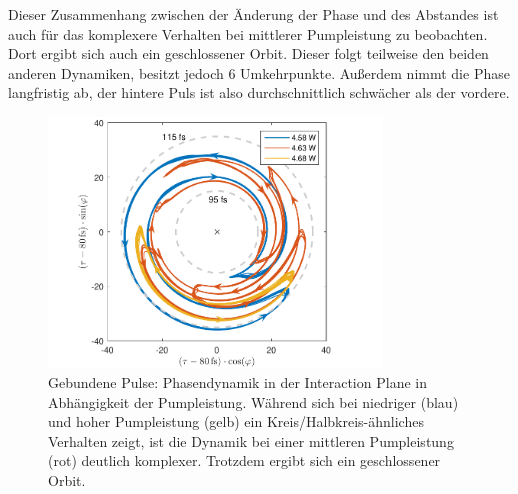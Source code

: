 \documentclass[bachelor,       %
               twoside,        %
               BCOR10mm,       %
               liststotoc,nomtotoc,bibtotoc, %
               english,ngerman, %
               final,          %
               ]{GAUBM}
\begin{document}
Dieser Zusammenhang zwischen der Änderung der Phase und des Abstandes ist auch für das komplexere Verhalten bei mittlerer Pumpleistung zu beobachten.
Dort ergibt sich auch ein geschlossener Orbit.
Dieser folgt teilweise den beiden anderen Dynamiken, besitzt jedoch 6 Umkehrpunkte.
Außerdem nimmt die Phase langfristig ab, der hintere Puls ist also durchschnittlich schwächer als der vordere.
 \begin{figure}[!htb]
	\centering
	\includegraphics[width=0.79\textwidth]{figures/4ms_25GSA_400m_MLrun_runBounceFix_InteractionPlaneArrows_final2.pdf}
	\caption{Gebundene Pulse: Phasendynamik in der Interaction Plane  in Abhängigkeit der Pumpleistung.
	Während sich bei niedriger (blau) und hoher Pumpleistung (gelb) ein Kreis/Halbkreis-ähnliches Verhalten zeigt, ist die Dynamik bei einer mittleren Pumpleistung (rot) deutlich komplexer. Trotzdem ergibt sich ein geschlossener Orbit.}
	\label{fig:interactionPlane}
\end{figure}
\clearpage
\end{document}
